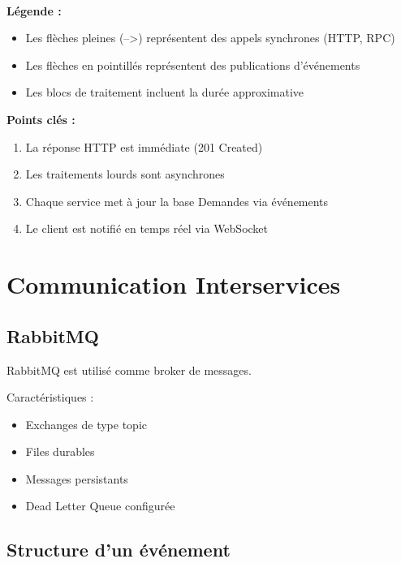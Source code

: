 \documentclass[12pt,a4paper]{article}
\begin{document}
\begin{verbatim}
    
\end{verbatim}

\textbf{Légende :}
\begin{itemize}
    \item Les flèches pleines (-->) représentent des appels synchrones (HTTP, RPC)
    \item Les flèches en pointillés représentent des publications d'événements
    \item Les blocs de traitement incluent la durée approximative
\end{itemize}

\textbf{Points clés :}
\begin{enumerate}
    \item La réponse HTTP est immédiate (201 Created)
    \item Les traitements lourds sont asynchrones
    \item Chaque service met à jour la base Demandes via événements
    \item Le client est notifié en temps réel via WebSocket
\end{enumerate}

\section{Communication Interservices}

\subsection{RabbitMQ}

RabbitMQ est utilisé comme broker de messages.

Caractéristiques :

\begin{itemize}
\item Exchanges de type topic
\item Files durables
\item Messages persistants
\item Dead Letter Queue configurée
\end{itemize}

\subsection{Structure d’un événement}
\end{document}
